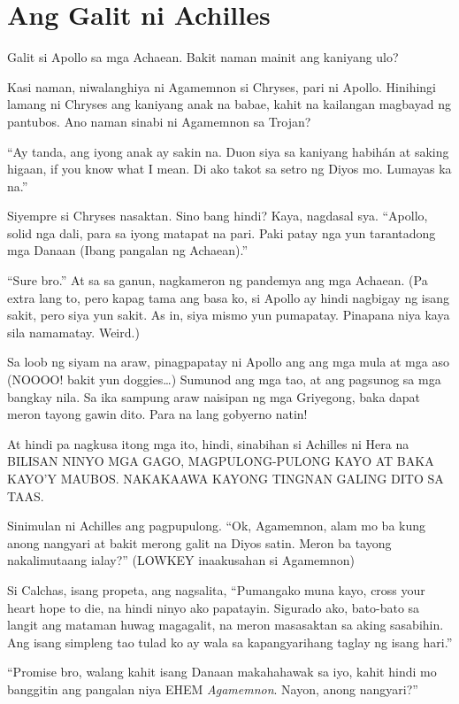 \documentclass[12pt,letterpaper]{report}
\begin{document}
\chapter{Ang Galit ni Achilles}

Galit si Apollo sa mga Achaean. Bakit naman mainit ang kaniyang ulo?

Kasi naman, niwalanghiya ni Agamemnon si Chryses, pari ni Apollo. Hinihingi lamang ni Chryses ang kaniyang anak na babae, kahit na kailangan magbayad ng pantubos. Ano naman sinabi ni Agamemnon sa Trojan?

``Ay tanda, ang iyong anak ay sakin na. Duon siya sa kaniyang habih\'{a}n at saking higaan, if you know what I mean. Di ako takot sa setro ng Diyos mo. Lumayas ka na.''

Siyempre si Chryses nasaktan. Sino bang hindi? Kaya, nagdasal sya. ``Apollo, solid nga dali, para sa iyong matapat na pari. Paki patay nga yun tarantadong mga Danaan (Ibang pangalan ng Achaean).''


``Sure bro.'' At sa sa ganun, nagkameron ng pandemya ang mga Achaean. (Pa extra lang to, pero kapag tama ang basa ko, si Apollo ay hindi nagbigay ng isang sakit, pero siya yun sakit. As in, siya mismo yun pumapatay. Pinapana niya kaya sila namamatay. Weird.)

Sa loob ng siyam na araw, pinagpapatay ni Apollo ang ang mga mula at mga aso (NOOOO! bakit yun doggies\dots) Sumunod ang mga tao, at ang pagsunog sa mga bangkay nila. Sa ika sampung araw naisipan ng mga Griyegong, baka dapat meron tayong gawin dito. Para na lang gobyerno natin!

At hindi pa nagkusa itong mga ito, hindi, sinabihan si Achilles ni Hera na BILISAN NINYO MGA GAGO, MAGPULONG-PULONG KAYO AT BAKA KAYO'Y MAUBOS. NAKAKAAWA KAYONG TINGNAN GALING DITO SA TAAS.

Sinimulan ni Achilles ang pagpupulong. ``Ok, Agamemnon, alam mo ba kung anong nangyari at bakit merong galit na Diyos satin. Meron ba tayong nakalimutaang ialay?'' (LOWKEY inaakusahan si Agamemnon)

Si Calchas, isang propeta, ang nagsalita, ``Pumangako muna kayo, cross your heart hope to die, na hindi ninyo ako papatayin. Sigurado ako, bato-bato sa langit ang mataman huwag magagalit, na meron masasaktan sa aking sasabihin. Ang isang simpleng tao tulad ko ay wala sa kapangyarihang taglay ng isang hari.''

``Promise bro, walang kahit isang Danaan makahahawak sa iyo, kahit hindi mo banggitin ang pangalan niya EHEM \textit{Agamemnon}. Nayon, anong nangyari?''
\end{document}
